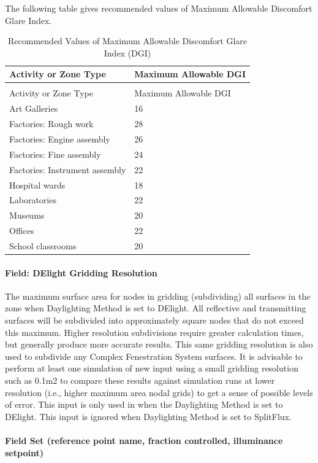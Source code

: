 The following table gives recommended values of Maximum Allowable Discomfort Glare Index.

\begin{longtable}[c]{@{}ll@{}}
\caption{Recommended Values of Maximum Allowable Discomfort Glare Index (DGI) \label{table:recommended-values-discomfort-glare-index}} \tabularnewline
\toprule
Activity or Zone Type & Maximum Allowable DGI \tabularnewline
\midrule
\endfirsthead

\caption[]{Recommended Values of Maximum Allowable Discomfort Glare Index (DGI)} \tabularnewline
\toprule
Activity or Zone Type & Maximum Allowable DGI \tabularnewline
\midrule
\endhead

Art Galleries & 16 \tabularnewline
Factories: Rough work & 28 \tabularnewline
Factories: Engine assembly & 26 \tabularnewline
Factories: Fine assembly & 24 \tabularnewline
Factories: Instrument assembly & 22 \tabularnewline
Hospital wards & 18 \tabularnewline
Laboratories & 22 \tabularnewline
Museums & 20 \tabularnewline
Offices & 22 \tabularnewline
School classrooms & 20 \tabularnewline
\bottomrule
\end{longtable}

\paragraph{Field: DElight Gridding Resolution}\label{field-gridding-resolution}

The maximum surface area for nodes in gridding (subdividing) all surfaces in the zone when Daylighting Method is set to DElight. All reflective and transmitting surfaces will be subdivided into approximately square nodes that do not exceed this maximum. Higher resolution subdivisions require greater calculation times, but generally produce more accurate results. This same gridding resolution is also used to subdivide any Complex Fenestration System surfaces. It is advisable to perform at least one simulation of new input using a small gridding resolution such as 0.1m2 to compare these results against simulation runs at lower resolution (i.e., higher maximum area nodal grids) to get a sense of possible levels of error. This input is only used in when the Daylighting Method is set to DElight. This input is ignored when Daylighting Method is set to SplitFlux.

\paragraph{Field Set (reference point name, fraction controlled, illuminance setpoint)}\label{field-set-daylightingcontrols}

